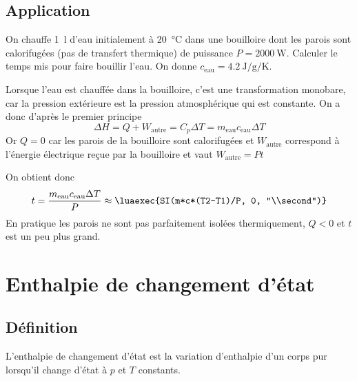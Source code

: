 \documentclass{cours}
\begin{document}
\subsection{Application}%
\label{sub:application_enthalpie}

On chauffe \SI{1}{\litre} d'eau initialement à \SI{20}{\celsius} dans une bouilloire dont les parois sont calorifugées (pas de transfert thermique) de puissance $P=\SI{2000}{\watt}$. Calculer le temps mis pour faire bouillir l'eau. On donne $c_\text{eau}=\SI{4.2}{\joule\per\gram\per\kelvin}$.  

Lorsque l'eau est chauffée dans la bouilloire, c'est une transformation monobare, car la pression extérieure est la pression atmosphérique qui est constante. On a donc d'après le premier principe
\begin{equation}
  \Delta H = Q + W_\text{autre} = C_p \Delta T = m_\text{eau} c_\text{eau} \Delta T
\end{equation}
Or $Q=0$ car les parois de la bouilloire sont calorifugées et $W_\text{autre}$ correspond à l'énergie électrique reçue par la bouilloire et vaut $W_\text{autre}=Pt$ 

On obtient donc 
\begin{equation}
  t =\frac{m_\text{eau}c_\text{eau}\Delta T}{P}\approx \luaexec{SI(m*c*(T2-T1)/P, 0, "\\second")}
\end{equation}
En pratique les parois ne sont pas parfaitement isolées thermiquement, $Q<0$ et $t$ est un peu plus grand.

\section{Enthalpie de changement d'état}%
\label{sec:enthalpie_de_changement_d_etat}

\subsection{Définition}%
\label{sub:definition_enthalpie_chgt_etat}

L'enthalpie de changement d'état est la variation d'enthalpie d'un corps pur lorsqu'il change d'état à $p$ et $T$ constants. 
\end{document}
